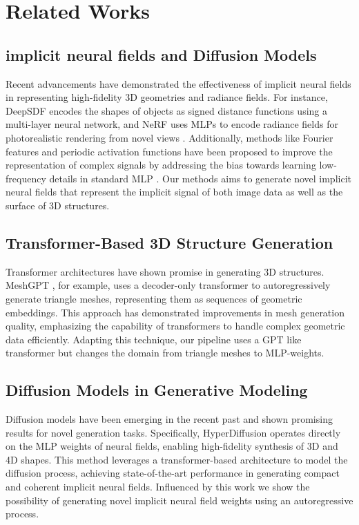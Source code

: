 \section{Related Works}
\label{sec:literature}

\subsection*{implicit neural fields and Diffusion Models}
Recent advancements have demonstrated the effectiveness of implicit neural fields in representing high-fidelity 3D geometries and radiance fields. For instance, DeepSDF \cite{park2019deepsdflearningcontinuoussigned} encodes the shapes of objects as signed distance functions using a multi-layer neural network, and NeRF uses MLPs to encode radiance fields for photorealistic rendering from novel views \cite{mildenhall2020nerfrepresentingscenesneural}. Additionally, methods like Fourier features and periodic activation functions have been proposed to improve the representation of complex signals by addressing the bias towards learning low-frequency details in standard MLP \cite{tancik2020fourierfeaturesletnetworks, sitzmann2020implicitneuralrepresentationsperiodic}. Our methods aims to generate novel implicit neural fields that represent the implicit signal of both image data as well as the surface of 3D structures.


\subsection*{Transformer-Based 3D Structure Generation}
Transformer architectures have shown promise in generating 3D structures. MeshGPT \cite{siddiqui2023meshgpt}, for example, uses a decoder-only transformer to autoregressively generate triangle meshes, representing them as sequences of geometric embeddings. This approach has demonstrated improvements in mesh generation quality, emphasizing the capability of transformers to handle complex geometric data efficiently. Adapting this technique, our pipeline uses a GPT like transformer but changes the domain from triangle meshes to MLP-weights.


\subsection*{Diffusion Models in Generative Modeling}
Diffusion models have been emerging in the recent past and shown promising results for novel generation tasks. Specifically, HyperDiffusion \cite{erkoç2023hyperdiffusion} operates directly on the MLP weights of neural fields, enabling high-fidelity synthesis of 3D and 4D shapes. This method leverages a transformer-based architecture to model the diffusion process, achieving state-of-the-art performance in generating compact and coherent implicit neural fields. Influenced by this work we show the possibility of generating novel implicit neural field weights using an autoregressive process.
